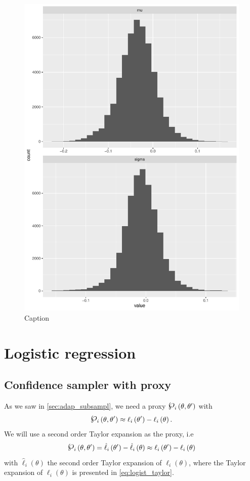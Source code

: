 \begin{figure}[H]
    \centering
    \includegraphics[scale = 0.7, page = 6]{figures/test.pdf}
    \caption{Caption}
    \label{fig:my_label}
\end{figure}{}
\section{Logistic regression}\label{sec:log_reg_experiments}
\subsection{Confidence sampler with proxy}
As we saw in \ref{sec:adap_subsampl}, we need a proxy $\powerset_i\left(\theta, \theta'\right)$ with $$\powerset_i\left(\theta, \theta'\right) \approx \ell_i\left(\theta'\right) - \ell_i\left(\theta\right). $$   
We will use a second order Taylor expansion as the proxy, i.e 
\begin{equation}
    \powerset_i\left(\theta, \theta'\right) = \hat{\ell}_i\left(\theta'\right) - \hat{\ell}_i\left(\theta\right) \approx \ell_i\left(\theta'\right) - \ell_i\left(\theta\right)
\end{equation}
with $\hat{\ell}_i\left(\theta\right)$ the second order Taylor expansion of $\ell_i\left(\theta\right)$, where the Taylor expansion of $\ell_i\left(\theta\right)$ is presented in \eqref{eq:logist_taylor}. 
